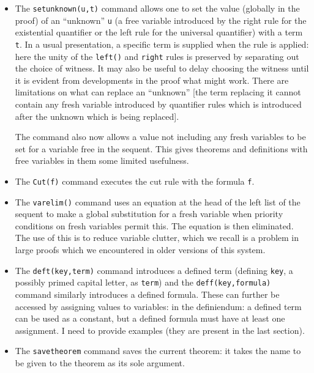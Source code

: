 \documentclass[12pt]{article}
\begin{document}
\begin{itemize}
Where the {\tt done} command fails, one might want to use {\tt back()} to restore the previous state, because the prover might have
made undesired global substitutions for unknowns.

\item  The {\tt setunknown(u,t)} command allows one to set the value (globally in the proof) of an ``unknown'' {\tt u} (a free variable introduced by the right rule for the existential quantifier or the left rule for the universal quantifier) with a term {\tt t}.  In a usual presentation, a specific term is supplied when the rule is applied:  here the unity of the {\tt left()} and {\tt right} rules is preserved by separating out the choice of witness.  It may also be useful to delay choosing the witness until it is evident from developments in the proof what might work.   There are limitations on what can replace an ``unknown'' [the term replacing it cannot contain any fresh variable introduced by quantifier rules which is introduced after the unknown which is being replaced].

The command also now allows a value not including any fresh variables to be set for a variable free in the sequent.  This gives theorems and definitions with free variables in them some limited usefulness.

\item  The {\tt Cut(f)} command executes the cut rule with the formula {\tt f}.

\item The {\tt varelim()} command uses an equation at the head of the left list of the sequent to make a global substitution for a fresh variable
when priority conditions on fresh variables permit this.  The equation is then eliminated.  The use of this is to reduce variable clutter, which we recall
is a problem in large proofs which we encountered in older versions of this system.

\item  The {\tt deft(key,term)} command introduces a defined term (defining {\tt key}, a possibly primed capital letter, as {\tt term}) and the {\tt deff(key,formula)} command similarly introduces a defined formula.  These can further be accessed by assigning values to variables: 
in the definiendum:  a defined term can be used as a constant, but a defined formula must have at least one assignment.  I need to provide examples (they are present in the last section).

\item The {\tt savetheorem} command saves the current theorem:  it takes the name to be given to the theorem as its sole argument.


\end{itemize}
\end{document}
